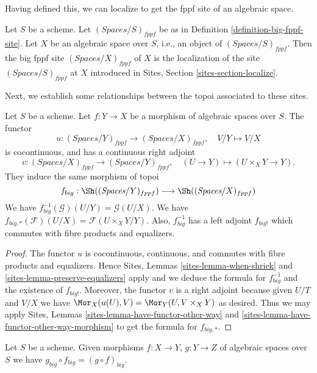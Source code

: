 \noindent
Having defined this, we can localize to get the fppf
site of an algebraic space.

\begin{definition}
\label{definition-big-small-fppf}
Let $S$ be a scheme. Let $(\textit{Spaces}/S)_{fppf}$ be as in
Definition \ref{definition-big-fppf-site}.
Let $X$ be an algebraic space over $S$, i.e., an object of
$(\textit{Spaces}/S)_{fppf}$. Then the big fppf site
{\it $(\textit{Spaces}/X)_{fppf}$} of $X$
is the localization of the site $(\textit{Spaces}/S)_{fppf}$
at $X$ introduced in Sites, Section \ref{sites-section-localize}.
\end{definition}

\noindent
Next, we establish some relationships between the topoi
associated to these sites.

\begin{lemma}
\label{lemma-morphism-big-fppf}
Let $S$ be a scheme.
Let $f : Y \to X$ be a morphism of algebraic spaces over $S$.
The functor
$$
u : (\textit{Spaces}/Y)_{fppf} \longrightarrow (\textit{Spaces}/X)_{fppf},
\quad
V/Y \longmapsto V/X
$$
is cocontinuous, and has a continuous right adjoint
$$
v : (\textit{Spaces}/X)_{fppf} \longrightarrow (\textit{Spaces}/Y)_{fppf},
\quad
(U \to Y) \longmapsto (U \times_X Y \to Y).
$$
They induce the same morphism of topoi
$$
f_{big} :
\Sh((\textit{Spaces}/Y)_{fppf})
\longrightarrow
\Sh((\textit{Spaces}/X)_{fppf})
$$
We have $f_{big}^{-1}(\mathcal{G})(U/Y) = \mathcal{G}(U/X)$.
We have $f_{big, *}(\mathcal{F})(U/X) = \mathcal{F}(U \times_X Y/Y)$.
Also, $f_{big}^{-1}$ has a left adjoint $f_{big!}$ which commutes with
fibre products and equalizers.
\end{lemma}

\begin{proof}
The functor $u$ is cocontinuous, continuous, and commutes with fibre products
and equalizers. Hence
Sites, Lemmas \ref{sites-lemma-when-shriek} and
\ref{sites-lemma-preserve-equalizers}
apply and we deduce the formula
for $f_{big}^{-1}$ and the existence of $f_{big!}$. Moreover,
the functor $v$ is a right adjoint because given $U/T$ and $V/X$
we have $\Mor_X(u(U), V) = \Mor_Y(U, V \times_X Y)$
as desired. Thus we may apply
Sites, Lemmas \ref{sites-lemma-have-functor-other-way} and
\ref{sites-lemma-have-functor-other-way-morphism} to get the
formula for $f_{big, *}$.
\end{proof}

\begin{lemma}
\label{lemma-composition-fppf}
Let $S$ be a scheme. Given morphisms $f : X \to Y$, $g : Y \to Z$
of algebraic spaces over $S$ we have
$g_{big} \circ f_{big} = (g \circ f)_{big}$.
\end{lemma}

